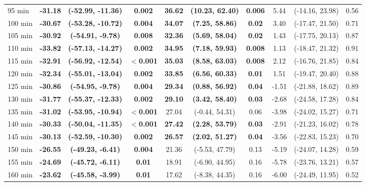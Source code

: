 \begin{table}[ht]
{\begin{tabular}{lccccccccc}
95 min & \textbf{-31.18} & \textbf{(-52.99, -11.36)} & \textbf{0.002} & \textbf{36.62} & \textbf{(10.23, 62.40)} & \textbf{0.006} & 5.44 & (-14.16, 23.98) & 0.56 \\
100 min & \textbf{-30.67} & \textbf{(-53.28, -10.72)} & \textbf{0.004} & \textbf{34.07} & \textbf{(7.25, 58.86)} & \textbf{0.02} & 3.40 & (-17.47, 21.50) & 0.71 \\
105 min & \textbf{-30.92} & \textbf{(-54.91, -9.78)} & \textbf{0.008} & \textbf{32.36} & \textbf{(5.69, 58.04)} & \textbf{0.02} & 1.43 & (-17.75, 20.13) & 0.87 \\
110 min & \textbf{-33.82} & \textbf{(-57.13, -14.27)} & \textbf{0.002} & \textbf{34.95} & \textbf{(7.18, 59.93)} & \textbf{0.008} & 1.13 & (-18.47, 21.32) & 0.91 \\
115 min & \textbf{-32.91} & \textbf{(-56.92, -12.54)} & \textbf{$<$0.001} & \textbf{35.03} & \textbf{(8.58, 63.03)} & \textbf{0.008} & 2.12 & (-16.76, 21.85) & 0.84 \\
120 min & \textbf{-32.34} & \textbf{(-55.01, -13.04)} & \textbf{0.002} & \textbf{33.85} & \textbf{(6.56, 60.33)} & \textbf{0.01} & 1.51 & (-19.47, 20.40) & 0.88 \\
125 min & \textbf{-30.86} & \textbf{(-54.95, -9.78)} & \textbf{0.004} & \textbf{29.34} & \textbf{(0.88, 56.92)} & \textbf{0.04} & -1.51 & (-21.88, 18.62) & 0.89 \\
130 min & \textbf{-31.77} & \textbf{(-55.37, -12.33)} & \textbf{0.002} & \textbf{29.10} & \textbf{(3.42, 58.40)} & \textbf{0.03} & -2.68 & (-24.58, 17.28) & 0.84 \\
135 min & \textbf{-31.02} & \textbf{(-53.95, -10.94)} & \textbf{$<$0.001} & 27.04 & (-0.44, 54.31) & 0.06 & -3.98 & (-24.02, 15.27) & 0.71 \\
140 min & \textbf{-30.33} & \textbf{(-50.04, -11.35)} & \textbf{$<$0.001} & \textbf{27.42} & \textbf{(2.28, 53.79)} & \textbf{0.03} & -2.91 & (-21.23, 16.02) & 0.78 \\
145 min & \textbf{-30.13} & \textbf{(-52.59, -10.30)} & \textbf{0.002} & \textbf{26.57} & \textbf{(2.02, 51.27)} & \textbf{0.04} & -3.56 & (-22.83, 15.23) & 0.70 \\
150 min & \textbf{-26.55} & \textbf{(-49.23, -6.41)} & \textbf{0.004} & 21.36 & (-5.53, 47.79) & 0.13 & -5.19 & (-24.07, 14.28) & 0.59 \\
155 min & \textbf{-24.69} & \textbf{(-45.72, -6.11)} & \textbf{0.01} & 18.91 & (-6.90, 44.95) & 0.16 & -5.78 & (-23.76, 13.21) & 0.57 \\
160 min & \textbf{-23.62} & \textbf{(-45.58, -3.99)} & \textbf{0.01} & 17.62 & (-8.38, 44.35) & 0.16 & -6.00 & (-24.49, 11.95) & 0.52 \\

\end{tabular}}
\end{table}
